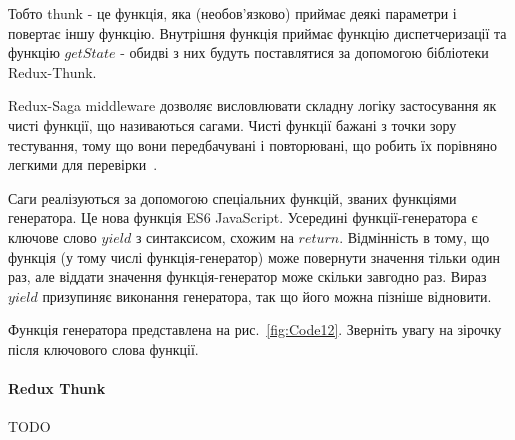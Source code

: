 Тобто thunk - це функція, яка (необов'язково) приймає деякі параметри і повертає іншу функцію. Внутрішня функція приймає функцію диспетчеризації та функцію $getState$ - обидві з них будуть поставлятися за допомогою бібліотеки Redux-Thunk.

Redux-Saga middleware дозволяє висловлювати складну логіку застосування як чисті функції, що називаються сагами. Чисті функції бажані з точки зору тестування, тому що вони передбачувані і повторювані, що робить їх порівняно легкими для перевірки~\cite{hung2018architectural}.

Саги реалізуються за допомогою спеціальних функцій, званих функціями генератора. Це нова функція ES6 JavaScript. Усередині функції-генератора є ключове слово $yield$ з синтаксисом, схожим на $return$. Відмінність в тому, що функція (у тому числі функція-генератор) може повернути значення тільки один раз, але віддати значення функція-генератор може скільки завгодно раз. Вираз $yield$ призупиняє виконання генератора, так що його можна пізніше відновити.

Функція генератора представлена на рис.~\ref{fig:Code12}. Зверніть увагу на зірочку після ключового слова функції.


\paragraph{Redux Thunk}

TODO